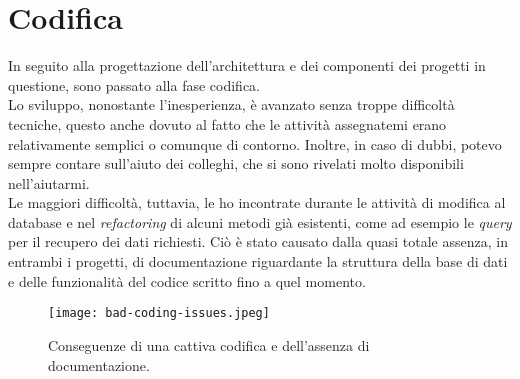 \section{Codifica}
In seguito alla progettazione dell'architettura e dei componenti dei progetti in questione, sono passato alla fase codifica.\\
Lo sviluppo, nonostante l'inesperienza, è avanzato senza troppe difficoltà tecniche, questo anche dovuto al fatto che le attività assegnatemi erano relativamente semplici o comunque di contorno. Inoltre, in caso di dubbi, potevo sempre contare sull'aiuto dei colleghi, che si sono rivelati molto disponibili nell'aiutarmi.\\
Le maggiori difficoltà, tuttavia, le ho incontrate durante le attività di modifica al database e nel \textit{refactoring} di alcuni metodi già esistenti, come ad esempio le \textit{query} per il recupero dei dati richiesti. Ciò è stato causato dalla quasi totale assenza, in entrambi i progetti, di documentazione riguardante la struttura della base di dati e delle funzionalità del codice scritto fino a quel momento. 

\begin{figure}[h]
\texttt{[image: bad-coding-issues.jpeg]}
\centering
\caption{Conseguenze di una cattiva codifica e dell'assenza di documentazione.} 
\label{fig:bad-coding-issues}
\end{figure}
